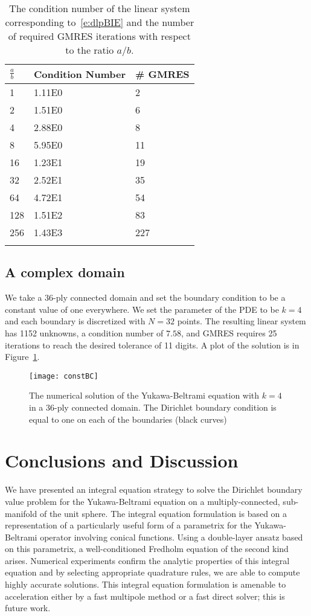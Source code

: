 \begin{table}[htps]
\caption{\label{t:example3} The condition number of the linear system
corresponding to~\eqref{e:dlpBIE} and the number of required GMRES
iterations with respect to the ratio $a/b$.}
\centering
\begin{tabular*}{0.8\textwidth}{@{\extracolsep{\fill}}lll}
$\frac{a}{b}$ & Condition Number & \# GMRES \\
\hline\noalign{\smallskip}
1   & 1.11E0 & 2   \\ 
2   & 1.51E0 & 6   \\
4   & 2.88E0 & 8   \\
8   & 5.95E0 & 11  \\
16  & 1.23E1 & 19  \\
32  & 2.52E1 & 35  \\
64  & 4.72E1 & 54  \\
128 & 1.51E2 & 83  \\
256 & 1.43E3 & 227 \\
\noalign{\smallskip}\hline
\end{tabular*}
\end{table}


\subsection{A complex domain}
We take a 36-ply connected domain and set the boundary condition to be a
constant value of one everywhere.  We set the parameter of the PDE to be
$k=4$ and each boundary is discretized with $N=32$ points.  The
resulting linear system has 1152 unknowns, a condition number of $7.58$,
and GMRES requires 25 iterations to reach the desired tolerance of 11
digits.  A plot of the solution is in Figure~\ref{f:36ply}.

\begin{figure}
  \centering
  \texttt{[image: constBC]}
  \caption{\label{f:36ply} The numerical solution of the Yukawa-Beltrami
  equation with $k=4$ in a 36-ply connected domain.  The Dirichlet
  boundary condition is equal to one on each of the boundaries (black
  curves)}
\end{figure}

\section{Conclusions and Discussion}
We have presented an integral equation strategy to solve the Dirichlet
boundary value problem for the Yukawa-Beltrami equation on a
multiply-connected, sub-manifold of the unit sphere.  The integral
equation formulation is based on a representation of a particularly
useful form of a parametrix for the Yukawa-Beltrami operator involving
conical functions.  Using a double-layer ansatz based on this
parametrix, a well-conditioned Fredholm equation of the second kind
arises.  Numerical experiments confirm the analytic properties of this
integral equation and by selecting appropriate quadrature rules, we are
able to compute highly accurate solutions.  This integral equation
formulation is amenable to acceleration either by a fast multipole
method or a fast direct solver; this is future work.  

